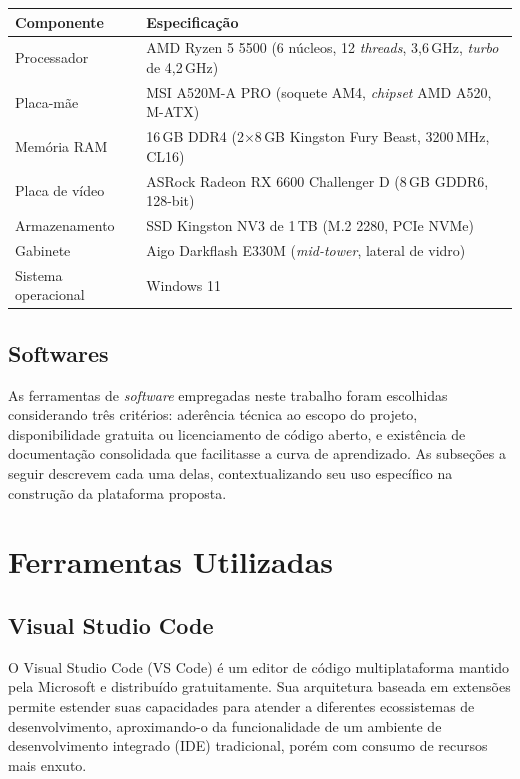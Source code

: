 \begin{quadro}[h!]
\caption{Configuração do equipamento utilizado no desenvolvimento}
\label{quad:equipamento}
\begin{tabular}{|p{4cm}|p{11cm}|}
\hline
\textbf{Componente} & \textbf{Especificação} \\ \hline
Processador & AMD Ryzen 5 5500 (6 núcleos, 12 \textit{threads}, 3,6\,GHz, \textit{turbo} de 4,2\,GHz) \\ \hline
Placa-mãe & MSI A520M-A PRO (soquete AM4, \textit{chipset} AMD A520, M-ATX) \\ \hline
Memória RAM & 16\,GB DDR4 (2$\times$8\,GB Kingston Fury Beast, 3200\,MHz, CL16) \\ \hline
Placa de vídeo & ASRock Radeon RX 6600 Challenger D (8\,GB GDDR6, 128-bit) \\ \hline
Armazenamento & SSD Kingston NV3 de 1\,TB (M.2 2280, PCIe NVMe) \\ \hline
Gabinete & Aigo Darkflash E330M (\textit{mid-tower}, lateral de vidro) \\ \hline
Sistema operacional & Windows 11 \\ \hline
\end{tabular}
\end{quadro}

\subsection{Softwares}

As ferramentas de \textit{software} empregadas neste trabalho foram escolhidas considerando três critérios: aderência técnica ao escopo do projeto, disponibilidade gratuita ou licenciamento de código aberto, e existência de documentação consolidada que facilitasse a curva de aprendizado. As subseções a seguir descrevem cada uma delas, contextualizando seu uso específico na construção da plataforma proposta.

\section{Ferramentas Utilizadas}

\subsection{Visual Studio Code}

O Visual Studio Code (VS Code) é um editor de código multiplataforma mantido pela Microsoft e distribuído gratuitamente. Sua arquitetura baseada em extensões permite estender suas capacidades para atender a diferentes ecossistemas de desenvolvimento, aproximando-o da funcionalidade de um ambiente de desenvolvimento integrado (IDE) tradicional, porém com consumo de recursos mais enxuto.

